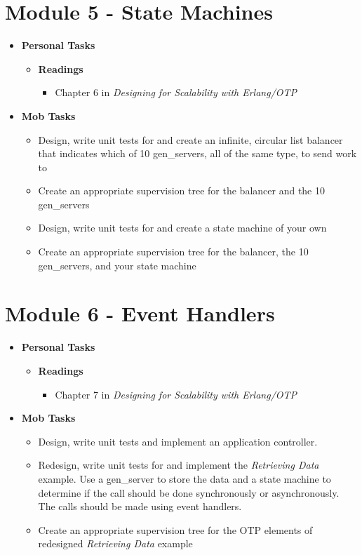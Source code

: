 \documentclass[12pt]{amsart}
\begin{document}
\section*{Module 5 - State Machines}
	 \begin{itemize}
		\item\textbf{ Personal Tasks}
            		\begin{itemize}
                    		\item \textbf{Readings}
                    		\begin{itemize}
                    			\item Chapter 6 in \textit{Designing for Scalability with Erlang/OTP}
                    		\end{itemize}
			\end{itemize}
		\item \textbf{Mob Tasks}
		\begin{itemize}
		\item Design, write unit tests for and create an infinite, circular list balancer that indicates which of 10 gen\_servers, all of the same type, to send work to
		\item Create an appropriate supervision tree for the balancer and the 10 gen\_servers
		\item Design, write unit tests for and create a state machine of your own
		\item Create an appropriate supervision tree for the balancer, the 10 gen\_servers, and your state machine
		
		\end{itemize}
	\end{itemize}
	\section*{Module 6 - Event Handlers} 
	 \begin{itemize}
		\item\textbf{ Personal Tasks}
		\begin{itemize}
            		\item \textbf{Readings}
            		\begin{itemize}
            			\item Chapter 7 in \textit{Designing for Scalability with Erlang/OTP}
            		\end{itemize}
		\end{itemize}
		\item \textbf{Mob Tasks}
		\begin{itemize}
		\item Design, write unit tests and implement an application controller. 
		\item Redesign, write unit tests for and implement the \textit{Retrieving Data} example. Use a gen\_server to store the data and a state machine to determine if the call should be done synchronously or asynchronously. The calls should be made using event handlers.
		\item Create an appropriate supervision tree for the OTP elements of  redesigned \textit{Retrieving Data} example
		\end{itemize}
	\end{itemize}
\end{document}
